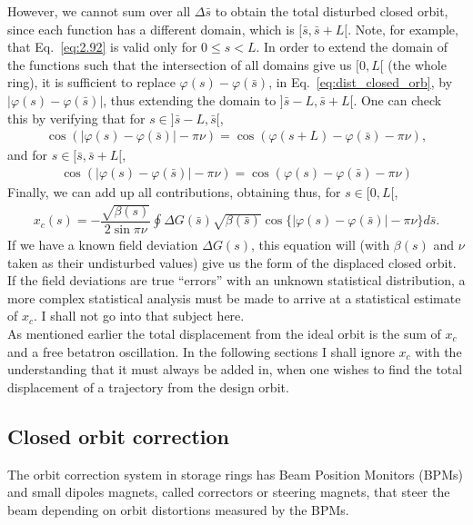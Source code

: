 \documentclass[../sands-adaptation.tex]{subfiles}
\begin{document}
However, we cannot sum over all $\Delta \bar{s}$ to obtain the total disturbed closed orbit, since each function has a different domain, which is $[\bar{s},\bar{s}+L[$. Note, for example, that Eq.~\eqref{eq:2.92} is valid only for $0 \leq s < L$. In order to extend the domain of the functions such that the intersection of all domains give us $[0,L[$ (the whole ring), it is sufficient to replace $\varphi(s) - \varphi(\bar{s})$, in Eq.~\eqref{eq:dist_closed_orb}, by $|\varphi(s) - \varphi(\bar{s})|$, thus extending the domain to $]\bar{s}-L,\bar{s}+L[$. One can check this by verifying that for $s \in ]\bar{s}-L,\bar{s}[$,
\begin{align*}
	\cos(|\varphi(s) - \varphi(\bar{s})| - \pi\nu) = \cos(\varphi(s+L) - \varphi(\bar{s})-\pi\nu),
\end{align*}
and for $s \in [\bar{s},\bar{s}+L[$,
\begin{align*}
\cos(|\varphi(s) - \varphi(\bar{s})| - \pi\nu) = \cos(\varphi(s) - \varphi(\bar{s}) - \pi\nu)
\end{align*}
Finally, we can add up all contributions, obtaining thus, for $s \in [0,L[$,
\begin{align}\label{eq:2.94}
	\boxed{ x_c(s) = -\dfrac{\sqrt{\beta(s)}}{2\sin\pi\nu} \oint \Delta G(\bar{s}) \sqrt{\beta(\bar{s})}\cos\{ |\varphi(s) - \varphi(\bar{s})| - \pi\nu \} d\bar{s} }.
\end{align}
If we have a known field deviation $\Delta G(s)$, this equation will (with $\beta(s)$ and $\nu$ taken as their undisturbed values) give us the form of the displaced closed orbit.\\
If the field deviations are true ``errors'' with an unknown statistical distribution, a more complex statistical analysis must be made to arrive at a statistical estimate of $x_c$. I shall not go into that subject here.\\
As mentioned earlier the total displacement from the ideal orbit is the sum of $x_c$ and a free betatron oscillation. In the following sections I shall ignore $x_c$ with the understanding
 that it must always be added in, when one wishes to find the total displacement of a trajectory
 from the design orbit.

 \subsection{Closed orbit correction}

 The orbit correction system in storage rings has Beam Position Monitors (BPMs) and small dipoles magnets, called correctors or steering magnets, that steer the beam depending on orbit distortions measured by the BPMs.
\end{document}
